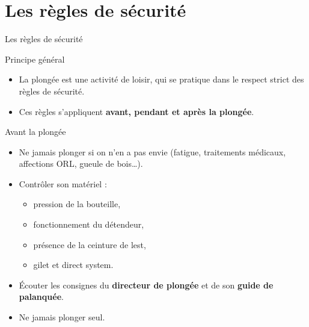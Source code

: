 \section{Les règles de sécurité}

\begin{frame}{Les règles de sécurité}
  \begin{block}{Principe général}
    \begin{itemize}
      \item La plongée est une activité de loisir, qui se pratique
            dans le respect strict des règles de sécurité.
      \item Ces règles s’appliquent \textbf{avant, pendant et après la plongée}.
    \end{itemize}
  \end{block}
\end{frame}

\begin{frame}{Avant la plongée}
\begin{itemize}
  \item \alert{Ne jamais plonger si on n’en a pas envie}
        (fatigue, traitements médicaux, affections ORL, gueule de bois…).
  \item Contrôler son matériel :
        \begin{itemize}
          \item pression de la bouteille,
          \item fonctionnement du détendeur,
          \item présence de la ceinture de lest,
          \item gilet et direct system.
        \end{itemize}
  \item Écouter les consignes du \textbf{directeur de plongée}
        et de son \textbf{guide de palanquée}.
  \item \alert{Ne jamais plonger seul}.
\end{itemize}
\end{frame}

